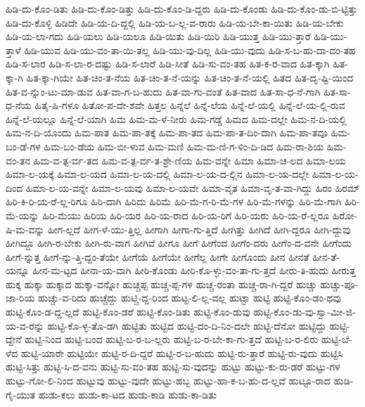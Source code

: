 {ಹಿಡಿ-ದು-ಕೊಂ-ಡಿತು
ಹಿಡಿ-ದು-ಕೊಂ-ಡಿತ್ತು
ಹಿಡಿ-ದು-ಕೊಂ-ಡಿ-ದ್ದರು
ಹಿಡಿ-ದು-ಕೊಂಡು
ಹಿಡಿ-ದು-ಕೊಂ-ಡು-ಬಿ-ಟ್ಟಿತ್ತು
ಹಿಡಿ-ದು-ಕೊಳ್ಳಿ
ಹಿಡಿದೇ
ಹಿಡಿ-ಯ-ದಿ-ದ್ದಲ್ಲಿ
ಹಿಡಿ-ಯ-ಬ-ಲ್ಲ-ವ-ರಾರು
ಹಿಡಿ-ಯ-ಬೇ-ಕಾ-ಯಿತು
ಹಿಡಿ-ಯ-ಬೇಕು
ಹಿಡಿ-ಯ-ಲಾ-ಗದು
ಹಿಡಿ-ಯಲು
ಹಿಡಿ-ಯಲೂ
ಹಿಡಿ-ಯಿತು
ಹಿಡಿ-ಯಿರಿ
ಹಿಡಿ-ಯುತ್ತ
ಹಿಡಿ-ಯು-ತ್ತಾರೆ
ಹಿಡಿ-ಯು-ತ್ತಾಳೆ
ಹಿಡಿ-ಯುವ
ಹಿಡಿ-ಯು-ವಂ-ತಾ-ಯಿ-ತಲ್ಲ
ಹಿಡಿ-ಯು-ವು-ದಿಲ್ಲ
ಹಿಡಿ-ಯು-ವುದು
ಹಿಡಿ-ಸ-ಬ-ಹು-ದಾ-ದಂ-ತಹ
ಹಿಡಿ-ಸ-ಲಾರ
ಹಿಡಿ-ಸ-ಲಾ-ರ-ದಷ್ಟು
ಹಿಡಿ-ಸ-ಲಾರೆ
ಹಿಡಿ-ಸೀತೆ
ಹಿಡಿ-ಸು-ವಂ-ತಹ
ಹಿತ-ಕ-ರ-ವಾದ
ಹಿತ-ಕ್ಕಾಗಿ
ಹಿತ-ಕ್ಕಾ-ಗಿ
ಹಿತ-ಕ್ಕಾ-ಗಿಯೇ
ಹಿತ-ಚಿಂ-ತ-ನೆಯ
ಹಿತ-ಚಿಂ-ತ-ನೆ-ಯನ್ನು
ಹಿತ-ಚಿಂ-ತ-ನೆ-ಯಲ್ಲಿ
ಹಿತದ
ಹಿತ-ದೃ-ಷ್ಟಿ-ಯಿಂದ
ಹಿತ-ವ-ನ್ನುಂ-ಟು-ಮಾ-ಡುವ
ಹಿತ-ವಾ-ಗ-ಬ-ಹುದು
ಹಿತ-ವಾ-ಗು-ವಂತೆ
ಹಿತ-ವಾದ
ಹಿತ-ಸಾ-ಧ-ನೆ-ಗಾಗಿ
ಹಿತ-ಸಾ-ಧ-ನೆಯ
ಹಿತೈ-ಷಿ-ಗಳೂ
ಹಿತೋ-ಪ-ದೇ-ಶವೇ
ಹಿತ್ತಲ
ಹಿನ್ನೆಲೆ
ಹಿನ್ನೆ-ಲೆಯ
ಹಿನ್ನೆ-ಲೆ-ಯಲ್ಲಿ
ಹಿನ್ನೆ-ಲೆ-ಯ-ಲ್ಲಿ-ರುವ
ಹಿನ್ನೆ-ಲೆ-ಯಲ್ಲೂ
ಹಿನ್ನೆ-ಲೆ-ಯಾಗಿ
ಹಿಮ
ಹಿಮ-ಮ-ಳೆ-ನೀರು
ಹಿಮ-ಗಡ್ಡೆ
ಹಿಮದ
ಹಿಮ-ದಲ್ಲೇ
ಹಿಮ-ನ-ದಿ-ಯಲ್ಲಿ
ಹಿಮ-ನ-ದಿ-ಯೊಂದು
ಹಿಮ-ಪಾತ
ಹಿಮ-ಪಾ-ತಕ್ಕೆ
ಹಿಮ-ಪಾ-ತದ
ಹಿಮ-ಪಾ-ತ-ದಿಂ-ದಾಗಿ
ಹಿಮ-ಪಾ-ತವೂ
ಹಿಮ-ಬಂ-ಡೆ-ಗಳ
ಹಿಮ-ಬಂ-ಡೆಯ
ಹಿಮ-ಬೀ-ಳುವ
ಹಿಮ-ಮಣಿ
ಹಿಮ-ಮ-ಣಿ-ಗ-ಳಿಂ-ದಿ-ಡಿದ
ಹಿಮ-ರಾ-ಶಿಯ
ಹಿಮ-ವಂ-ತನ
ಹಿಮ-ವ-ತ್ಪ-ರ್ವ-ತದ
ಹಿಮ-ವ-ತ್ಪ-ರ್ವ-ತ-ಶ್ರೇ-ಣಿಯ
ಹಿಮ-ವನ್ನೇ
ಹಿಮಾ
ಹಿಮಾ-ಚ-ಲದ
ಹಿಮಾ-ಲಯ
ಹಿಮಾ-ಲ-ಯಕ್ಕೆ
ಹಿಮಾ-ಲ-ಯದ
ಹಿಮಾ-ಲ-ಯ-ದಲ್ಲಿ
ಹಿಮಾ-ಲ-ಯ-ದ-ಲ್ಲಿನ
ಹಿಮಾ-ಲ-ಯ-ದಲ್ಲೇ
ಹಿಮಾ-ಲ-ಯ-ದಿಂದ
ಹಿಮಾ-ಲ-ಯ-ವನ್ನೇ
ಹಿಮಾ-ಲ-ಯವು
ಹಿಮಾ-ಲ-ಯವೇ
ಹಿಮಾ-ವೃತ
ಹಿಮಾ-ವೃ-ತ-ವಾ-ಗಿದ್ದು
ಹಿರಂ
ಹಿರಮ್
ಹಿರಿ-ಕಿ-ರಿ-ಯ-ರೆ-ಲ್ಲ-ರಿಗೂ
ಹಿರಿ-ದಾಗಿ
ಹಿರಿದು
ಹಿರಿಮೆ
ಹಿರಿ-ಮೆ-ಗ-ರಿ-ಮೆ-ಗಳ
ಹಿರಿ-ಮೆ-ಗಳನ್ನು
ಹಿರಿ-ಮೆ-ಗಾಗಿ
ಹಿರಿ-ಮೆ-ಯನ್ನು
ಹಿರಿ-ಮೆಯು
ಹಿರಿಯ
ಹಿರಿ-ಯರ
ಹಿರಿ-ಯ-ರಾದ
ಹಿರಿ-ಯ-ರಿಗೆ
ಹಿರಿ-ಯರು
ಹಿರಿ-ಯ-ರೆ-ಲ್ಲರೂ
ಹಿರೋ-ಷಿ-ಮ-ವನ್ನು
ಹೀಗ-ಲ್ಲದೆ
ಹೀಗ-ಳೆ-ಯು-ತ್ತಿಲ್ಲ
ಹೀಗಾಗಿ
ಹೀಗಾ-ಗು-ತ್ತಿದೆ
ಹೀಗಿತ್ತು
ಹೀಗಿದೆ
ಹೀಗಿ-ದ್ದರೂ
ಹೀಗಿ-ದ್ದುವು
ಹೀಗಿದ್ದೂ
ಹೀಗಿ-ರ-ಬೇಕು
ಹೀಗಿ-ರು-ವಾಗ
ಹೀಗಿವೆ
ಹೀಗೂ
ಹೀಗೆ
ಹೀಗೆಂದ
ಹೀಗೆಂ-ದರು
ಹೀಗೆಂ-ದ-ವನೇ
ಹೀಗೆಂದು
ಹೀಗೆ-ನ್ನುತ್ತ
ಹೀಗೆ-ನ್ನು-ತ್ತಿ-ದ್ದಂ-ತೆಯೇ
ಹೀಗೆಯೆ
ಹೀಗೆಯೇ
ಹೀಗೆಲ್ಲ
ಹೀಗೇ
ಹೀಗೊಂದು
ಹೀನ
ಹೀನತೆ
ಹೀನ-ತೆ-ಯನ್ನೂ
ಹೀನ-ಮ-ಟ್ಟದ
ಹೀನಾ-ಯ-ವಾಗಿ
ಹೀರಿ-ಕೊಂಡು
ಹೀರಿ-ಕೊ-ಳ್ಳು-ವಂ-ತಾ-ಗು-ತ್ತದೆ
ಹೀರು-ತಿ-ಹುದು
ಹೀರುತ್ತ
ಹುಕ್ಕ
ಹುಕ್ಕಾ
ಹುಕ್ಕಾದ
ಹುಕ್ಕಾ-ವನ್ನೋ
ಹುಚ್ಚಪ್ಪ
ಹುಚ್ಚ-ಪ್ಪ-ಗಳ
ಹುಚ್ಚ-ರಂತಾ
ಹುಚ್ಚ-ರಾ-ಗಿ-ದ್ದರೆ
ಹುಚ್ಚು
ಹುಚ್ಚು-ಪೂ-ಜಾ-ರಿಯ
ಹುಚ್ಚು-ವ-ರಿದು
ಹುಚ್ಚೆದ್ದು
ಹುಟ್ಚಿ-ದ್ದ-ರಿಂದ
ಹುಟ್ಟ-ಲಿ-ಲ್ಲ-ವಲ್ಲ
ಹುಟ್ಟಾ
ಹುಟ್ಟಿ
ಹುಟ್ಟಿ-ಕೊಂ-ಡಂ-ಥವು
ಹುಟ್ಟಿ-ಕೊಂ-ಡ-ದ್ದ-ಲ್ಲದೆ
ಹುಟ್ಟಿ-ಕೊಂ-ಡರೆ
ಹುಟ್ಟಿ-ಕೊಂ-ಡಿತು
ಹುಟ್ಟಿ-ಕೊಂ-ಡುವು
ಹುಟ್ಟಿ-ಕೊಂ-ಡು-ವು-ಸ್ವಾ-ಮೀ-ಜಿ-ಯ-ವ-ರನ್ನು
ಹುಟ್ಟಿ-ಕೊ-ಳ್ಳ-ತೊ-ಡಗಿ
ಹುಟ್ಟಿತು
ಹುಟ್ಟಿದ
ಹುಟ್ಟಿ-ದಂ-ದಿ-ನಿಂ-ದಲೇ
ಹುಟ್ಟಿ-ದೆನೋ
ಹುಟ್ಟಿದ್ದು
ಹುಟ್ಟಿ-ದ್ದೇನೆ
ಹುಟ್ಟಿ-ನಿಂದ
ಹುಟ್ಟಿ-ಬಂದ
ಹುಟ್ಟಿ-ಬ-ರ-ಬ-ಲ್ಲರು
ಹುಟ್ಟಿ-ಬ-ರ-ಬೇ-ಕಾ-ಗು-ತ್ತದೆ
ಹುಟ್ಟಿ-ಬ-ರ-ಲಿರು
ಹುಟ್ಟಿ-ಬೆ-ಳೆದ
ಹುಟ್ಟಿ-ಯಾರೇ
ಹುಟ್ಟಿಯೇ
ಹುಟ್ಟಿ-ರ-ದಿ-ದ್ದರೆ
ಹುಟ್ಟಿ-ರ-ಬ-ಹುದು
ಹುಟ್ಟಿ-ರು-ತ್ತಾರೆ
ಹುಟ್ಟಿ-ರು-ವುದು
ಹುಟ್ಟಿಸಿ
ಹುಟ್ಟಿ-ಸಿತ್ತು
ಹುಟ್ಟಿ-ಸಿ-ದ-ವನು
ಹುಟ್ಟಿ-ಸು-ವಂ-ತಹ
ಹುಟ್ಟಿ-ಸು-ವುದನ್ನು
ಹುಟ್ಟು
ಹುಟ್ಟು-ಕು-ರು-ಡರೆ
ಹುಟ್ಟು-ಗಳ
ಹುಟ್ಟು-ಗೋ-ಲಿ-ನಿಂದ
ಹುಟ್ಟುವು
ಹುಟ್ಟು-ವುದೇ
ಹುಟ್ಟು-ಹಬ್ಬ
ಹುಟ್ಟು-ಹಾ-ಕ-ಬ-ಹು-ದ-ಲ್ಲವೆ
ಹುಟ್ಟೂ-ರಾದ
ಹುಡಿ-ಗೈ-ಯುತ
ಹುಡು-ಕಲು
ಹುಡು-ಕಾ-ಟದ
ಹುಡು-ಕಾಡಿ
ಹುಡು-ಕಾ-ಡಿತು
}
